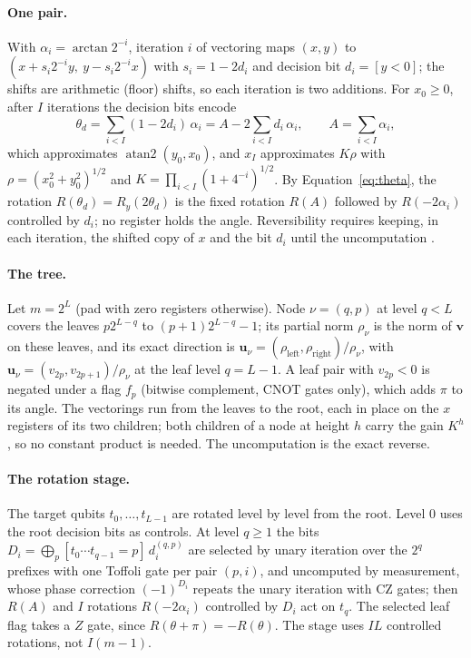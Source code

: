 \documentclass[9pt,twocolumn]{extarticle}
\begin{document}
\paragraph{One pair.} With $\alpha_i = \arctan 2^{-i}$, iteration $i$ of
vectoring maps $(x, y)$ to $(x + s_i 2^{-i} y,\ y - s_i 2^{-i} x)$ with
$s_i = 1 - 2d_i$ and decision bit $d_i = [y < 0]$; the shifts are arithmetic
(floor) shifts, so each iteration is two additions. For $x_0 \ge 0$, after $I$
iterations the decision bits encode
\begin{equation}
\theta_d = \sum_{i<I} (1 - 2d_i)\,\alpha_i = A - 2\sum_{i<I} d_i\,\alpha_i ,
\qquad A = \sum_{i<I}\alpha_i ,
\label{eq:theta}
\end{equation}
which approximates $\operatorname{atan2}(y_0, x_0)$, and $x_I$ approximates
$K\rho$ with $\rho = (x_0^2 + y_0^2)^{1/2}$ and
$K = \prod_{i<I}(1 + 4^{-i})^{1/2}$. By Equation~\eqref{eq:theta}, the
rotation $R(\theta_d) = R_y(2\theta_d)$ is the fixed rotation $R(A)$ followed by
$R(-2\alpha_i)$ controlled by $d_i$; no register holds the angle. Reversibility
requires keeping, in each iteration, the shifted copy of $x$ and the bit $d_i$
until the uncomputation \cite{bennett1973logical}.

\paragraph{The tree.} Let $m = 2^L$ (pad with zero registers otherwise). Node
$\nu = (q, p)$ at level $q < L$ covers the leaves $p2^{L-q}$ to
$(p+1)2^{L-q} - 1$; its partial norm $\rho_\nu$ is the norm of $\bm v$ on these
leaves, and its exact direction is
$\bm u_\nu = (\rho_{\mathrm{left}}, \rho_{\mathrm{right}})/\rho_\nu$, with
$\bm u_\nu = (v_{2p}, v_{2p+1})/\rho_\nu$ at the leaf level $q = L - 1$. A leaf
pair with $v_{2p} < 0$ is negated under a flag $f_p$ (bitwise complement, CNOT
gates only), which adds $\pi$ to its angle. The vectorings run from the leaves
to the root, each in place on the $x$ registers of its two children; both
children of a node at height $h$ carry the gain $K^h$, so no constant product is
needed. The uncomputation is the exact reverse.

\paragraph{The rotation stage.} The target qubits $t_0, \dots, t_{L-1}$ are
rotated level by level from the root. Level $0$ uses the root decision bits as
controls. At level $q \ge 1$ the bits
$D_i = \bigoplus_p [t_0 \cdots t_{q-1} = p]\, d_i^{(q,p)}$ are selected by
unary iteration over the $2^q$ prefixes \cite{babbush2018encoding} with one
Toffoli gate per pair $(p, i)$, and uncomputed by measurement, whose phase
correction $(-1)^{D_i}$ repeats the unary iteration with CZ gates; then $R(A)$ and
$I$ rotations $R(-2\alpha_i)$ controlled by $D_i$ act on $t_q$. The selected
leaf flag takes a $Z$ gate, since $R(\theta + \pi) = -R(\theta)$. The stage
uses $IL$ controlled rotations, not $I(m - 1)$.
\end{document}
